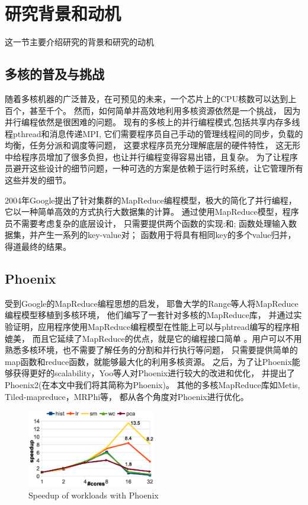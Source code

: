 \section{研究背景和动机}
这一节主要介绍研究的背景和研究的动机


\subsection{多核的普及与挑战}
随着多核机器的广泛普及，在可预见的未来，一个芯片上的CPU核数可以达到上百个，甚至千个\cite{borkar2007core}。
然而，如何简单并高效地利用多核资源依然是一个挑战，
因为并行编程依然是很困难的问题。
现有的多核上的并行编程模式,包括共享内存多线程pthread和消息传递MPI,
它们需要程序员自己手动的管理线程间的同步，负载的均衡，任务分派和调度等问题，
这要求程序员充分理解底层的硬件特性，
这无形中给程序员增加了很多负担，也让并行编程变得容易出错，且复杂。
为了让程序员避开这些设计的细节问题，一种可选的方案是依赖于运行时系统，让它管理所有这些并发的细节。


2004年Google提出了针对集群的MapReduce编程模型，极大的简化了并行编程\cite{dean2004mapreduce}，
它以一种简单高效的方式执行大数据集的计算。
通过使用MapReduce模型，程序员不需要考虑复杂的底层设计，
只需要提供两个函数的实现:和;
函数处理输入数据集，并产生一系列的key-value对；
函数用于将具有相同key的多个value归并，得道最终的结果。

\subsection{Phoenix}
受到Google的MapReduce编程思想的启发，
耶鲁大学的Range等人将MapReduce编程模型移植到多核环境，
他们编写了一套针对多核的MapReduce库，
并通过实验证明，应用程序使用MapReduce编程模型在性能上可以与phtread编写的程序相媲美，
而且它延续了MapReduce的优点，就是它的编程接口简单
。用户可以不用熟悉多核环境，也不需要了解任务的分割和并行执行等问题，
只需要提供简单的map函数和reduce函数，就能够最大化的利用多核资源。
之后，为了让Phoenix能够获得更好的scalability，Yoo等人对Phoenix进行较大的改进和优化，
并提出了Phoenix2\cite{yoo2009phoenix2}(在本文中我们将其简称为Phoenix)。
其他的多核MapReduce库如Metis\cite{mao2010metis},
Tiled-mapreduce\cite{chen2010tiled}，MRPhi\cite{lu2013mrphi}等，
都从各个角度对Phoenix进行优化。

\begin{figure}[!h!t]  
	\centering
	\includegraphics[width=0.5\textwidth]{eps/phoenix_speedup.eps}
	\caption{Speedup of workloads with Phoenix}
	\label{fig:phoenix:speedup}
\end{figure}


